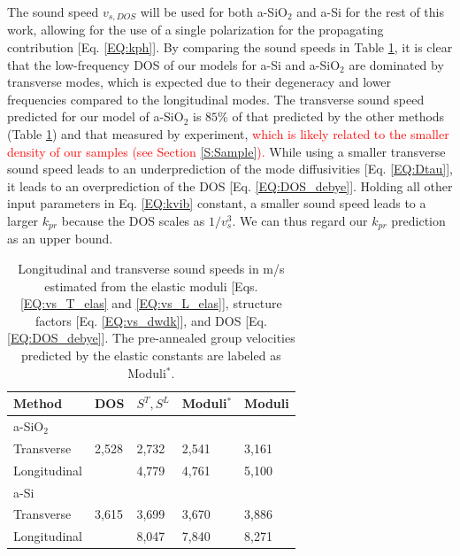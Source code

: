 \documentclass[aps,prb,onecolumn,preprint,superscriptaddress,footinbib,amsmath,amssymb,floatfix]{revtex4}
\begin{document}
The sound speed $v_{s,DOS}$ will be used for both 
a-SiO$_2$ and a-Si for the rest of this work, allowing 
for the use of a single polarization for the propagating 
contribution [Eq. \eqref{EQ:kph}]. 
By comparing the sound speeds in Table \ref{T:vs}, it is clear that 
the low-frequency DOS of our models for a-Si and a-SiO$_2$ are 
dominated by 
transverse modes, which is expected due to their degeneracy and lower 
frequencies compared to the longitudinal modes.  
The transverse sound speed predicted for our model of 
a-SiO$_2$ is $85\%$ of that predicted by 
the other methods (Table \ref{T:vs}) and that measured by experiment,
\cite{ruocco_high-frequency_2001,polian_elastic_2002,
ruzicka_evidence_2004} 
\textcolor{red}{which is likely related to the smaller density 
of our samples (see Section \ref{S:Sample}).} 
While using a smaller transverse sound speed 
leads to an underprediction of the
mode diffusivities [Eq. \eqref{EQ:Dtau}], it leads to an
overprediction of the DOS [Eq. \eqref{EQ:DOS_debye}]. 
Holding all other input parameters in Eq. \eqref{EQ:kvib} constant,
a smaller sound speed leads to a larger $k_{pr}$ 
because the DOS scales as $1/v^3_{s}$. We can thus regard
our $k­_{pr}$ prediction as an upper bound.

\begin{center}
\begingroup
\begin{table}
\caption{\label{T:vs}
Longitudinal and transverse sound speeds in m/s estimated from the 
elastic moduli [Eqs. \eqref{EQ:vs_T_elas} and \eqref{EQ:vs_L_elas}], 
structure factors [Eq. \eqref{EQ:vs_dwdk}], and 
DOS [Eq. \eqref{EQ:DOS_debye}]. The pre-annealed group velocities 
predicted by the elastic constants are labeled as Moduli$^*$.}
\begin{tabular}{lllll}
\hline \hline
Method & DOS & $S^{T}, S^{L}$ & Moduli$^*$ & Moduli \\
\hline
a-SiO$_2$ \\
\hline
Transverse & 2,528 & 2,732 & 2,541 & 3,161 \\
Longitudinal &  & 4,779 & 4,761 & 5,100 \\
\hline
a-Si \\
\hline
Transverse & 3,615 & 3,699 & 3,670 & 3,886 \\
Longitudinal &  & 8,047 & 7,840 & 8,271 \\
\hline \hline
\end{tabular}
\end{table}
\endgroup
\end{center}
\end{document}
